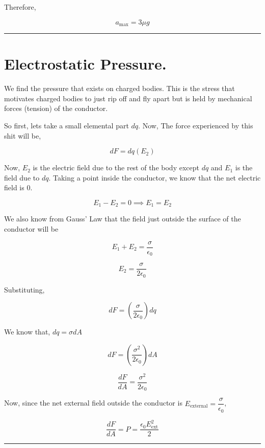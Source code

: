 \documentclass[twocolumn]{article}
\begin{document}
\begin{CJK*}{UTF8}{gbsn}
Therefore, 

\[
    \boxed{a_{\text{max}} = 3\mu g}
\]

\vspace{0.1in}
\hrule

\section*{Electrostatic Pressure.}

We find the pressure that exists on charged bodies. This is the stress that motivates charged bodies to just rip off and fly apart but is held by mechanical forces (tension) of the conductor. 

So first, lets take a small elemental part \(dq\). Now, The force experienced by this shit will be,

\[
    dF = dq(E_2)
\]

Now, \(E_2\) is the electric field due to the rest of the body except \(dq\) and \(E_1\) is the field due to \(dq\). Taking a point inside the conductor, we know that the net electric field is 0. 

\[
    E_1 - E_2 = 0 \implies E_1 = E_2
\]

We also know from Gauss' Law that the field just outside the surface of the conductor will be 

\[
    E_1 + E_2 = \frac{\sigma}{\epsilon_0}
\]

\[
    E_2 = \frac{\sigma}{2\epsilon_0}
\]

Substituting, 

\[
    dF = (\frac{\sigma}{2\epsilon_0}) dq
\]

We know that, \(dq = \sigma dA\)

\[
    dF = (\frac{\sigma^{2}}{2 \epsilon_0})dA 
\]

\[
    \frac{dF}{dA} = \frac{\sigma^{2}}{2\epsilon_0}
\]

Now, since the net external field outside the conductor is \(E_{\text{external}} = \dfrac{\sigma}{\epsilon_0} \),

\[
    \boxed{\frac{dF}{dA} = P = \frac{\epsilon_0 E_{\text{ext} }^{2}}{2} }
\]

\vspace{0.1in}
\hrule 

\end{CJK*} %
\end{document}
